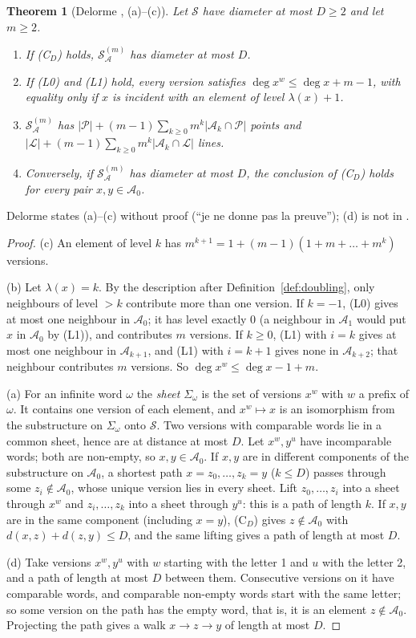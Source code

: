 \documentclass[11pt]{amsart}
\newtheorem{theorem}{Theorem}[section]
\theoremstyle{definition}
\theoremstyle{remark}
\numberwithin{equation}{section}
\newcommand{\cA}{\mathcal A}
\newcommand{\cL}{\mathcal L}
\newcommand{\cP}{\mathcal P}
\newcommand{\cS}{\mathcal S}
\begin{document}
\begin{theorem}[Delorme {\cite[\S7]{D85a}}, (a)--(c)]\label{thm:delorme}
Let $\cS$ have diameter at most $D\ge2$ and let $m\ge2$.
\begin{enumerate}[label=(\alph*)]
\item If (C$_D$) holds, $\cS^{(m)}_\cA$ has diameter at most $D$.
\item If (L0) and (L1) hold, every version satisfies $\deg x^w\le\deg x+m-1$, with equality only if $x$ is incident
  with an element of level $\lambda(x)+1$.
\item $\cS^{(m)}_\cA$ has $|\cP|+(m-1)\sum_{k\ge0}m^k|\cA_k\cap\cP|$ points and
  $|\cL|+(m-1)\sum_{k\ge0}m^k|\cA_k\cap\cL|$ lines.
\item Conversely, if $\cS^{(m)}_\cA$ has diameter at most $D$, the conclusion of (C$_D$) holds for every pair
  $x,y\in\cA_0$.
\end{enumerate}
\end{theorem}

Delorme states (a)--(c) without proof (``je ne donne pas la preuve''); (d) is not in \cite{D85a}.

\begin{proof}
(c) An element of level $k$ has $m^{k+1}=1+(m-1)(1+m+\dots+m^k)$ versions.

(b) Let $\lambda(x)=k$. By the description after Definition~\ref{def:doubling}, only neighbours of level $>k$
contribute more than one version. If $k=-1$, (L0) gives at most one neighbour in $\cA_0$; it has level exactly 0 (a
neighbour in $\cA_1$ would put $x$ in $\cA_0$ by (L1)), and contributes $m$ versions. If $k\ge0$, (L1) with $i=k$ gives
at most one neighbour in $\cA_{k+1}$, and (L1) with $i=k+1$ gives none in $\cA_{k+2}$; that neighbour contributes $m$
versions. So $\deg x^w\le\deg x-1+m$.

(a) For an infinite word $\omega$ the \emph{sheet} $\Sigma_\omega$ is the set of versions $x^w$ with $w$ a prefix of
$\omega$. It contains one version of each element, and $x^w\mapsto x$ is an isomorphism from the substructure on
$\Sigma_\omega$ onto $\cS$. Two versions with comparable words lie in a common sheet, hence are at distance at most
$D$. Let $x^w,y^u$ have incomparable words; both are non-empty, so $x,y\in\cA_0$. If $x,y$ are in different components
of the substructure on $\cA_0$, a shortest path $x=z_0,\dots,z_k=y$ ($k\le D$) passes through some $z_i\notin\cA_0$,
whose unique version lies in every sheet. Lift $z_0,\dots,z_i$ into a sheet through $x^w$ and $z_i,\dots,z_k$ into a
sheet through $y^u$: this is a path of length $k$. If $x,y$ are in the same component (including $x=y$), (C$_D$) gives
$z\notin\cA_0$ with $d(x,z)+d(z,y)\le D$, and the same lifting gives a path of length at most $D$.

(d) Take versions $x^w,y^u$ with $w$ starting with the letter 1 and $u$ with the letter 2, and a path of length at most
$D$ between them. Consecutive versions on it have comparable words, and comparable non-empty words start with the same
letter; so some version on the path has the empty word, that is, it is an element $z\notin\cA_0$. Projecting the path
gives a walk $x\to z\to y$ of length at most $D$.
\end{proof}
\end{document}
